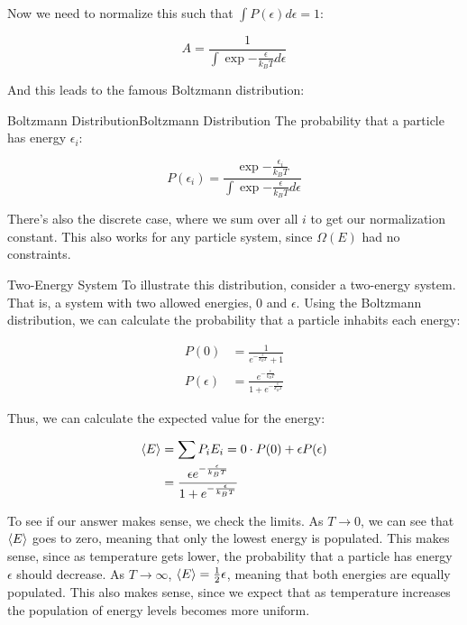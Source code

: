 \documentclass{book}
\theoremstyle{plain}
\begin{document}
        Now we need to normalize this such that $\int P(\epsilon) d\epsilon = 1$:

        \[ A = \frac{1}{\int \exp{-\frac{\epsilon}{k_BT}} d\epsilon }\]

        And this leads to the famous Boltzmann distribution:

        \begin{theorem}{Boltzmann Distribution}{Boltzmann Distribution}
            The probability that a particle has energy $\epsilon_i$:

            \[ P(\epsilon_i) = \frac{\exp{-\frac{\epsilon_i}{k_BT}}}{\int \exp{-\frac{\epsilon}{k_BT}} d \epsilon}\]

            There's also the discrete case, where we sum over all $i$ to get our normalization constant. This also works for any particle system, since $\Omega(E)$ had no constraints.
        \end{theorem}


        \begin{example}{Two-Energy System}{}
            To illustrate this distribution, consider a two-energy system. That is, a system with two allowed energies, 0 and $\epsilon$. Using the Boltzmann distribution, we can calculate the probability that a particle inhabits each energy:

            \begin{align*}
                P(0) &= \frac{1}{e^{-\frac{\epsilon}{k_BT}} + 1}\\
                P(\epsilon) &= \frac{e^{-\frac{\epsilon}{k_BT}}}{1 + e^{-\frac{\epsilon}{k_BT}}}
            \end{align*}

            Thus, we can calculate the expected value for the energy:

            \begin{align*}
                \langle E \rangle &= \sum P_iE_i = 0 \cdot P(0) + \epsilon P(\epsilon)\\
                &= \frac{\epsilon e^{-\frac{\epsilon}{k_BT}}}{1 + e^{-\frac{\epsilon}{k_BT}}}
            \end{align*}

            To see if our answer makes sense, we check the limits. As $T \to 0$, we can see that $\langle E \rangle$ goes to zero, meaning that only the lowest energy is populated. This makes sense, since as temperature gets lower, the probability that a particle has energy $\epsilon$ should decrease. As $T \to \infty$, $\langle E \rangle = \frac{1}{2} \epsilon$, meaning that both energies are equally populated. This also makes sense, since we expect that as temperature increases the population of energy levels becomes more uniform.
        \end{example}
\end{document}

